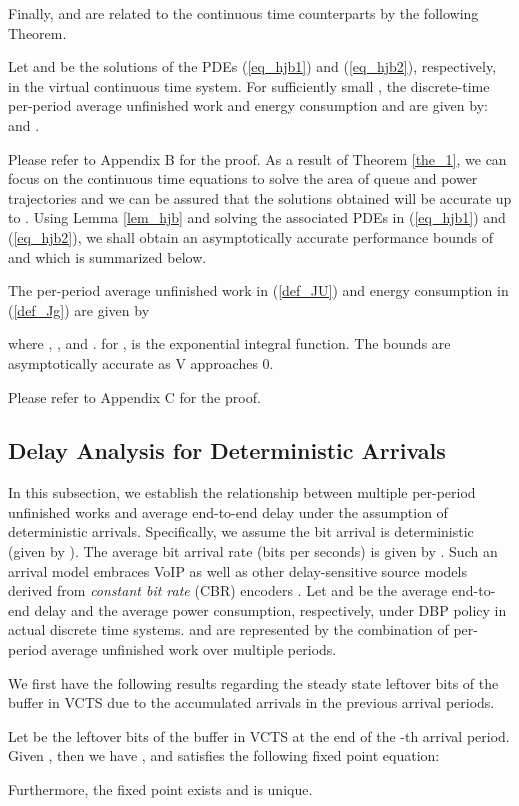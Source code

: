 \documentclass[11pt,journal, onecolumn]{./IEEEtran}
\newcommand{\red}{\color{black}}
\begin{document}
Finally,  and  are related to the continuous time counterparts by the following Theorem.
\begin{Theorem}\label{the_1}
 Let  and  be the solutions of the PDEs (\ref{eq_hjb1}) and (\ref{eq_hjb2}), respectively, in the virtual continuous time system. {\red For sufficiently small ,} the discrete-time per-period average unfinished work and energy consumption  and  are given by:  and . ~\hfill\IEEEQED
\end{Theorem}

Please refer to Appendix B for the proof. {\red As a result of Theorem \ref{the_1}, we can focus on the continuous time equations to solve the area of queue and power trajectories and we can be assured that the solutions obtained will be accurate up to . } Using Lemma \ref{lem_hjb} and solving the associated PDEs in (\ref{eq_hjb1}) and (\ref{eq_hjb2}), we shall obtain an asymptotically accurate performance bounds of  and  which is summarized below.

\begin{Theorem}[Performance Bounds of  and  {\red in VCTS}]\label{the_bounds} The per-period average unfinished work  in (\ref{def_JU}) and energy consumption  in (\ref{def_Jg}) are given by


where ,
,
and .  for , is the exponential integral function. The bounds are asymptotically accurate as V approaches 0. ~\hfill\IEEEQED
\end{Theorem}

Please refer to Appendix C for the proof.


\subsection{Delay Analysis for Deterministic Arrivals}

In this subsection, we establish the relationship between multiple per-period unfinished works and average end-to-end delay under the assumption of deterministic arrivals. Specifically, we assume the bit arrival  is deterministic (given by ). The average bit arrival rate (bits per seconds) is given by . Such an arrival model embraces VoIP as well as other delay-sensitive source models derived from {\em constant bit rate} (CBR) encoders \cite{eunkyung_kim_efficient_2007, narbutt_gauging_2006}. Let  and  be the average end-to-end delay and the average power consumption, respectively, under DBP policy  in actual discrete time systems.  and  are represented by the combination of per-period average unfinished work over multiple periods. {\red We first have the following results regarding the steady state leftover bits of the buffer in VCTS due to the accumulated arrivals in the previous arrival periods.
\begin{Lemma}\label{lem_left} Let  be the leftover bits of the buffer in VCTS at the end of the -th arrival period. Given , then we have , and  satisfies the following fixed point equation:

Furthermore, the fixed point  exists and is unique. ~\hfill\IEEEQED
\end{Lemma}
}
\end{document}
